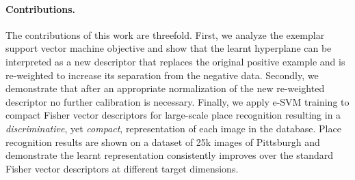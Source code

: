 \documentclass[10pt,twocolumn,letterpaper]{article}
\begin{document}
   \paragraph{Contributions.} %
      The contributions of this work are threefold.
      First, we analyze the exemplar support vector machine objective and show that the learnt hyperplane can be interpreted as a new descriptor that replaces the original positive example and is re-weighted to increase its separation from the negative data. Secondly, we demonstrate that after an appropriate normalization of the new re-weighted descriptor no further calibration is necessary. Finally, we apply e-SVM training to compact Fisher vector descriptors for large-scale place recognition resulting in a {\em discriminative}, yet {\em compact}, representation of each image in the database. Place recognition results are shown on a dataset of 25k images of Pittsburgh and demonstrate the learnt representation consistently improves over the standard Fisher vector descriptors at different target dimensions.
\end{document}
